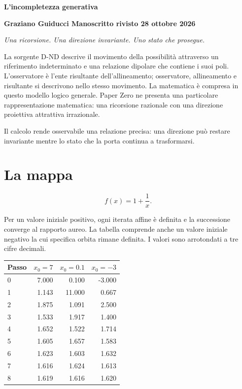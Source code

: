 \documentclass[10pt,a4paper]{article}
\begin{document}
\begin{center}{\LARGE\bfseries L'incompletezza generativa}\end{center}

\textbf{Graziano Guiducci \textperiodcentered{}  Manoscritto rivisto \textperiodcentered{}  28 ottobre 2026}
\par

\emph{Una ricorsione. Una direzione invariante. Uno stato che prosegue.}
\par

La sorgente D-ND descrive il movimento della possibilità attraverso un riferimento indeterminato e una relazione dipolare che contiene i suoi poli. L'osservatore è l'ente risultante dell'allineamento; osservatore, allineamento e risultante si descrivono nello stesso movimento. La matematica è compresa in questo modello logico generale. Paper Zero ne presenta una particolare rappresentazione matematica: una ricorsione razionale con una direzione proiettiva attrattiva irrazionale.
\par

Il calcolo rende osservabile una relazione precisa: una direzione può restare invariante mentre lo stato che la porta continua a trasformarsi.
\par

\section*{La mappa}

\[
f(x)=1+\frac{1}{x}.
\]

Per un valore iniziale positivo, ogni iterata affine è definita e la successione converge al rapporto aureo. La tabella comprende anche un valore iniziale negativo la cui specifica orbita rimane definita. I valori sono arrotondati a tre cifre decimali.
\par

\begin{center}
\begin{tabular}{lrrr}
\toprule
Passo & $x_0=7$ & $x_0=0.1$ & $x_0=-3$ \\
\midrule
0 & 7.000 & 0.100 & -3.000 \\
1 & 1.143 & 11.000 & 0.667 \\
2 & 1.875 & 1.091 & 2.500 \\
3 & 1.533 & 1.917 & 1.400 \\
4 & 1.652 & 1.522 & 1.714 \\
5 & 1.605 & 1.657 & 1.583 \\
6 & 1.623 & 1.603 & 1.632 \\
7 & 1.616 & 1.624 & 1.613 \\
8 & 1.619 & 1.616 & 1.620 \\
\bottomrule
\end{tabular}
\end{center}
\end{document}
